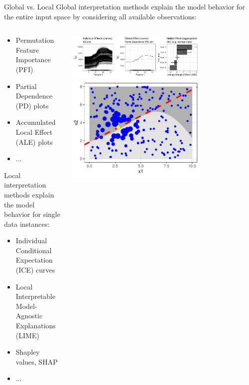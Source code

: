 \documentclass[11pt,compress,t,notes=noshow, aspectratio=169, xcolor=table]{beamer}
\begin{document}
\begin{frame}{Global vs. Local}
Global interpretation methods explain the model behavior for the entire input space by considering all available observations:
\begin{columns}[c, totalwidth=\textwidth]
    \begin{column}{0.65\linewidth}
	\begin{itemize}
		\item Permutation Feature Importance (PFI)
		\item Partial Dependence (PD) plots
		\item Accumulated Local Effect (ALE) plots
		\item ...
	\end{itemize}
\bigskip
Local interpretation methods explain the model behavior for single data instances:
	\begin{itemize}
		\item Individual Conditional Expectation (ICE) curves
		\item Local Interpretable Model-Agnostic Explanations (LIME)
		\item Shapley values, SHAP
		\item ...
	\end{itemize}
	\end{column}
	\begin{column}{0.35\linewidth}
	\begin{center}
	\includegraphics[page=1, width=0.7\textwidth, trim=215 0 215 43, clip]{figure/feature-effect}
	\medskip
	\includegraphics[width=0.7\textwidth]{figure/lime5}
	\end{center}
	\end{column}
	\end{columns}
\end{frame}
\end{document}
